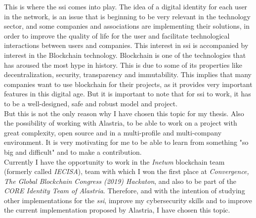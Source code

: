 \documentclass[a4paper, 12pt]{article} %
\begin{document}
            This is where the \acrlong{ssi} comes into play. The idea of a digital identity for each user in the network, is an issue that is beginning to be very relevant in the technology sector, and some companies and associations are implementing their solutions, in order to improve the quality of life for the user and facilitate technological interactions between users and companies. This interest in \acrlong{ssi} is accompanied by interest in the Blockchain technology. Blockchain is one of the technologies that has aroused the most hype in history. This is due to some of its properties like decentralization, security, transparency and immutability. This implies that many companies want to use blockchain for their projects, as it provides very important features in this digital age. But it is important to note that for \acrlong{ssi} to work, it has to be a well-designed, safe and robust model and project.\\
            
            But this is not the only reason why I have chosen this topic for my thesis. Also the possibility of working with Alastria, to be able to work on a project with great complexity, open source and in a multi-profile and multi-company environment. It is very motivating for me to be able to learn from something "so big and difficult" and to make a contribution.\\
            
            Currently I have the opportunity to work in the \textit{Inetum} blockchain team (formerly called \textit{IECISA}), team with which I won the first place at \textit{Convergence, The Global Blockchain Congress (2019) Hackaton}\cite{iecisa-hackaton},  and also to be part of the \textit{CORE Identity Team of Alastria}. Therefore, and with the intention of studying other implementations for the \textit{\acrshort{ssi}}, improve my cybersecurity skills and to improve the current implementation proposed by Alastria, I have chosen this topic.
\end{document}
